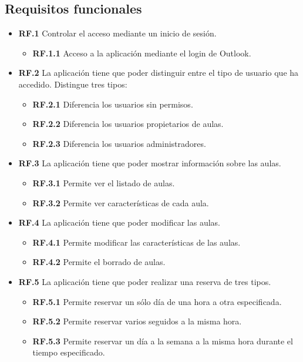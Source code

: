 \subsection{Requisitos funcionales} 
\begin{itemize}
    \item \textbf{RF.1} Controlar el acceso mediante un inicio de sesión.
    \begin{itemize}
        \item \textbf{RF.1.1} Acceso a la aplicación mediante el login de Outlook.
    \end{itemize}
    \item \textbf{RF.2} La aplicación tiene que poder distinguir entre el tipo de usuario que ha accedido. Distingue tres tipos:
    \begin{itemize}
        \item \textbf{RF.2.1} Diferencia los usuarios sin permisos.
        \item \textbf{RF.2.2} Diferencia los usuarios propietarios de aulas.
        \item \textbf{RF.2.3} Diferencia los usuarios administradores.
    \end{itemize}
    \item \textbf{RF.3} La aplicación tiene que poder mostrar información sobre las aulas.
    \begin{itemize}
        \item \textbf{RF.3.1} Permite ver el listado de aulas.
        \item \textbf{RF.3.2} Permite ver características de cada aula.
    \end{itemize}
    \item \textbf{RF.4} La aplicación tiene que poder modificar las aulas.
    \begin{itemize}
        \item \textbf{RF.4.1} Permite modificar las características de las aulas.
        \item \textbf{RF.4.2} Permite el borrado de aulas.
    \end{itemize}
    \item \textbf{RF.5} La aplicación tiene que poder realizar una reserva de tres tipos.
    \begin{itemize}
        \item \textbf{RF.5.1} Permite reservar un sólo día de una hora a otra especificada.
        \item \textbf{RF.5.2} Permite reservar varios seguidos a la misma hora.
        \item \textbf{RF.5.3} Permite reservar un día a la semana a la misma hora durante el tiempo especificado. 

\end{itemize}
\end{itemize}
